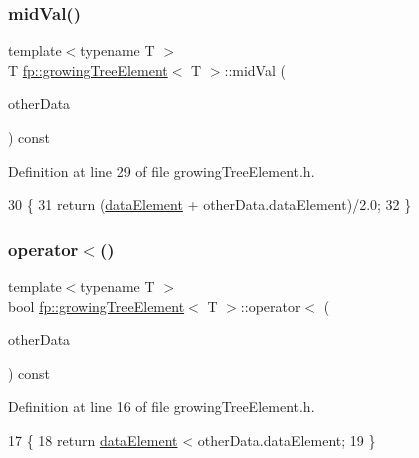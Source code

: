 \subsubsection{\texorpdfstring{mid\+Val()}{midVal()}}
{\footnotesize\ttfamily template$<$typename T $>$ \\
T \hyperlink{classfp_1_1growingTreeElement}{fp\+::growing\+Tree\+Element}$<$ T $>$\+::mid\+Val (\begin{DoxyParamCaption}\item[{const \hyperlink{classfp_1_1labeledData}{labeled\+Data}$<$ T $>$ \&}]{other\+Data }\end{DoxyParamCaption}) const\hspace{0.3cm}{\ttfamily [inline]}}



Definition at line 29 of file growing\+Tree\+Element.\+h.


\begin{DoxyCode}
30                 \{
31                     \textcolor{keywordflow}{return} (\hyperlink{classfp_1_1growingTreeElement_ae56213ef46269673e10a4046d7cfc7e4}{dataElement} + otherData.dataElement)/2.0;
32                 \}
\end{DoxyCode}
\mbox{\label{classfp_1_1growingTreeElement_ada6dd34623e1db4f83711eaa6ebdb44a}} 
\subsubsection{\texorpdfstring{operator$<$()}{operator<()}}
{\footnotesize\ttfamily template$<$typename T $>$ \\
bool \hyperlink{classfp_1_1growingTreeElement}{fp\+::growing\+Tree\+Element}$<$ T $>$\+::operator$<$ (\begin{DoxyParamCaption}\item[{const \hyperlink{classfp_1_1labeledData}{labeled\+Data}$<$ T $>$ \&}]{other\+Data }\end{DoxyParamCaption}) const\hspace{0.3cm}{\ttfamily [inline]}}



Definition at line 16 of file growing\+Tree\+Element.\+h.


\begin{DoxyCode}
17                 \{
18                     \textcolor{keywordflow}{return} \hyperlink{classfp_1_1growingTreeElement_ae56213ef46269673e10a4046d7cfc7e4}{dataElement} < otherData.dataElement;
19                 \}
\end{DoxyCode}
\mbox{\label{classfp_1_1growingTreeElement_af928932ccf63dd846c014750d3a7d020}} 
